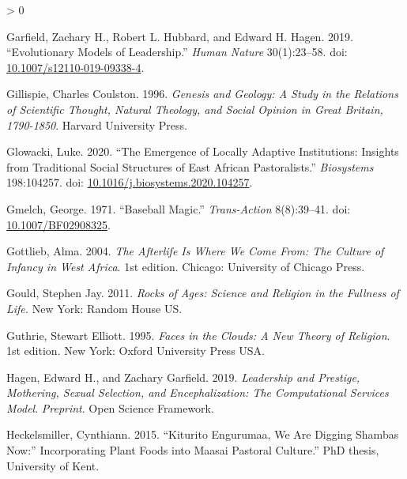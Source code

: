 \documentclass[
  11pt,
]{article}
\newlength{\cslhangindent}
\newenvironment{CSLReferences}[2] %
 {%
  \setlength{\parindent}{0pt}
  \ifodd #1 \everypar{\setlength{\hangindent}{\cslhangindent}}\ignorespaces\fi
  \ifnum #2 > 0
  \setlength{\parskip}{#2\baselineskip}
  \fi
 }%
 {}
\begin{document}
\begin{CSLReferences}{1}{0}
\leavevmode\hypertarget{ref-garfieldEvolutionaryModelsLeadership2019}{}%
Garfield, Zachary H., Robert L. Hubbard, and Edward H. Hagen. 2019. {``Evolutionary {Models} of {Leadership}.''} \emph{Human Nature} 30(1):23--58. doi: \href{https://doi.org/10.1007/s12110-019-09338-4}{10.1007/s12110-019-09338-4}.

\leavevmode\hypertarget{ref-gillispie1996genesis}{}%
Gillispie, Charles Coulston. 1996. \emph{Genesis and Geology: A Study in the Relations of Scientific Thought, Natural Theology, and Social Opinion in {Great Britain}, 1790-1850}. {Harvard University Press}.

\leavevmode\hypertarget{ref-glowackiEmergenceLocallyAdaptive2020}{}%
Glowacki, Luke. 2020. {``The Emergence of Locally Adaptive Institutions: {Insights} from Traditional Social Structures of {East African} Pastoralists.''} \emph{Biosystems} 198:104257. doi: \href{https://doi.org/10.1016/j.biosystems.2020.104257}{10.1016/j.biosystems.2020.104257}.

\leavevmode\hypertarget{ref-gmelchBaseballMagic1971}{}%
Gmelch, George. 1971. {``Baseball Magic.''} \emph{Trans-Action} 8(8):39--41. doi: \href{https://doi.org/10.1007/BF02908325}{10.1007/BF02908325}.

\leavevmode\hypertarget{ref-gottliebAfterlifeWhereWe2004}{}%
Gottlieb, Alma. 2004. \emph{The {Afterlife Is Where We Come From}: {The Culture} of {Infancy} in {West Africa}}. 1st edition. {Chicago}: {University of Chicago Press}.

\leavevmode\hypertarget{ref-gouldRocksAgesScience2011}{}%
Gould, Stephen Jay. 2011. \emph{Rocks of {Ages}: {Science} and {Religion} in the {Fullness} of {Life}.} {New York}: {Random House US}.

\leavevmode\hypertarget{ref-guthrieFacesCloudsNew1995}{}%
Guthrie, Stewart Elliott. 1995. \emph{Faces in the {Clouds}: {A New Theory} of {Religion}}. 1st edition. {New York}: {Oxford University Press USA}.

\leavevmode\hypertarget{ref-hagenLeadershipPrestigeMothering2019}{}%
Hagen, Edward H., and Zachary Garfield. 2019. \emph{Leadership and Prestige, Mothering, Sexual Selection, and Encephalization: {The} Computational Services Model}. \emph{Preprint}. {Open Science Framework}.

\leavevmode\hypertarget{ref-heckelsmillerKituritoEngurumaaWe2015}{}%
Heckelsmiller, Cynthiann. 2015. {``Kiturito Engurumaa, We Are Digging Shambas Now:'' {Incorporating} Plant Foods into {Maasai} Pastoral Culture.''} PhD thesis, University of Kent.


\end{CSLReferences}
\end{document}
